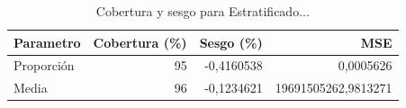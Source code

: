 \begin{table}

\caption{Cobertura y sesgo para Estratificado...}
\centering
\begin{tabular}[t]{lrrr}
\toprule
Parametro & Cobertura (\%) & Sesgo (\%) & MSE\\
\midrule
Proporción & 95 & -0,4160538 & 0,0005626\\
Media & 96 & -0,1234621 & 19691505262,9813271\\
\bottomrule
\end{tabular}
\end{table}
